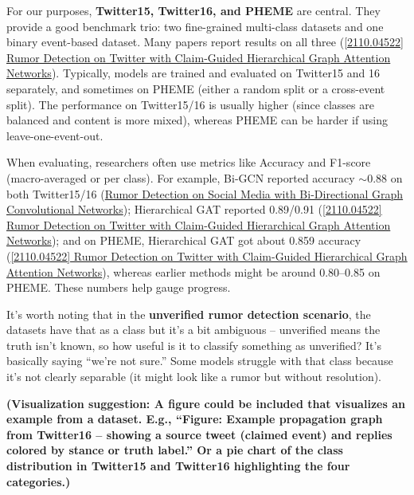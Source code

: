 \documentclass[12pt,a4paper]{report}
\begin{document}
For our purposes, \textbf{Twitter15, Twitter16, and PHEME} are central. They provide a good benchmark trio: two fine-grained multi-class datasets and one binary event-based dataset. Many papers report results on all three (\href{https://arxiv.org/abs/2110.04522#:~:text=Claim,for%20detecting%20rumors%20at%20early}{[2110.04522] Rumor Detection on Twitter with Claim-Guided Hierarchical Graph Attention Networks}). Typically, models are trained and evaluated on Twitter15 and 16 separately, and sometimes on PHEME (either a random split or a cross-event split). The performance on Twitter15/16 is usually higher (since classes are balanced and content is more mixed), whereas PHEME can be harder if using leave-one-event-out.

When evaluating, researchers often use metrics like Accuracy and F1-score (macro-averaged or per class). For example, Bi-GCN reported accuracy \(\sim0.88\) on both Twitter15/16 (\href{https://ojs.aaai.org/index.php/AAAI/article/view/5393/5249#:~:text=RvNN%200,526}{Rumor Detection on Social Media with Bi-Directional Graph Convolutional Networks}); Hierarchical GAT reported 0.89/0.91 (\href{https://ar5iv.org/pdf/2110.04522#:~:text=Method%20Twitter15%20Twitter16%20PHEME%20Acc,GAT%2FDT%200.813%200.848%200.837}{[2110.04522] Rumor Detection on Twitter with Claim-Guided Hierarchical Graph Attention Networks}); and on PHEME, Hierarchical GAT got about 0.859 accuracy (\href{https://ar5iv.org/pdf/2110.04522#:~:text=Method%20Twitter15%20Twitter16%20PHEME%20Acc,GAT%2FDT%200.813%200.848%200.837}{[2110.04522] Rumor Detection on Twitter with Claim-Guided Hierarchical Graph Attention Networks}), whereas earlier methods might be around 0.80–0.85 on PHEME. These numbers help gauge progress.

It’s worth noting that in the \textbf{unverified rumor detection scenario}, the datasets have that as a class but it’s a bit ambiguous – unverified means the truth isn’t known, so how useful is it to classify something as unverified? It’s basically saying “we’re not sure.” Some models struggle with that class because it’s not clearly separable (it might look like a rumor but without resolution).

\textbf{(Visualization suggestion: A figure could be included that visualizes an example from a dataset. E.g., “Figure: Example propagation graph from Twitter16 – showing a source tweet (claimed event) and replies colored by stance or truth label.” Or a pie chart of the class distribution in Twitter15 and Twitter16 highlighting the four categories.)}
\end{document}
